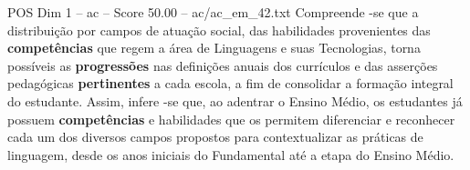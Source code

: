 \begin{textsample}{POS Dim 1 – ac – Score 50.00 – ac/ac\_em\_42.txt}
Compreende -se que a distribuição por campos de atuação social, das habilidades provenientes das \textbf{competências} que regem a área de Linguagens e suas Tecnologias, torna possíveis as \textbf{progressões} nas definições anuais dos currículos e das asserções pedagógicas \textbf{pertinentes} a cada escola, a fim de consolidar a formação integral do estudante.
Assim, infere -se que, ao adentrar o Ensino Médio, os estudantes já possuem \textbf{competências} e habilidades que os permitem diferenciar e reconhecer cada um dos diversos campos propostos para contextualizar as práticas de linguagem, desde os anos iniciais do Fundamental até a etapa do Ensino Médio.

\end{textsample}
